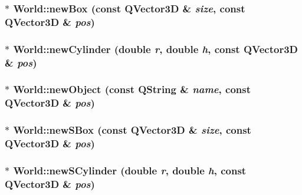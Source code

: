 \label{class_robot_model_1_1_world_a2ccf0c4dd817ecae42edbb82f54289a2}
\hypertarget{class_robot_model_1_1_world_a9c100912af0adb5275b73b6660efe475}{
\subsubsection[{newBox}]{ $\ast$ World::newBox (const QVector3D \& {\em size}, \/  const QVector3D \& {\em pos})}}
\label{class_robot_model_1_1_world_a9c100912af0adb5275b73b6660efe475}
\hypertarget{class_robot_model_1_1_world_a8dd79f7cf657eda9de58181bc9fbb564}{
\subsubsection[{newCylinder}]{ $\ast$ World::newCylinder (double {\em r}, \/  double {\em h}, \/  const QVector3D \& {\em pos})}}
\label{class_robot_model_1_1_world_a8dd79f7cf657eda9de58181bc9fbb564}
\hypertarget{class_robot_model_1_1_world_a82289c85d931bffc967a90a12e04477a}{
\subsubsection[{newObject}]{ $\ast$ World::newObject (const QString \& {\em name}, \/  const QVector3D \& {\em pos})}}
\label{class_robot_model_1_1_world_a82289c85d931bffc967a90a12e04477a}
\hypertarget{class_robot_model_1_1_world_adf2304f9f78471e03d2962b326fe4ce9}{
\subsubsection[{newSBox}]{ $\ast$ World::newSBox (const QVector3D \& {\em size}, \/  const QVector3D \& {\em pos})}}
\label{class_robot_model_1_1_world_adf2304f9f78471e03d2962b326fe4ce9}
\hypertarget{class_robot_model_1_1_world_a36ee6c4337fbe9097f2bc30a1843cdb5}{
\subsubsection[{newSCylinder}]{ $\ast$ World::newSCylinder (double {\em r}, \/  double {\em h}, \/  const QVector3D \& {\em pos})}}
